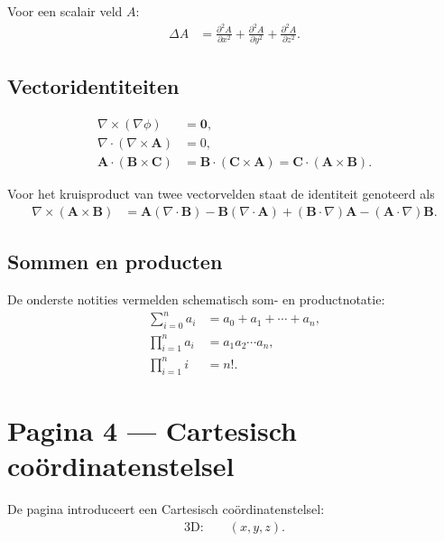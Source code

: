 \documentclass[11pt]{article}
\newcommand{\vect}[1]{\mathbf{#1}}
\begin{document}
Voor een scalair veld $A$:
\begin{align*}
\Delta A
  &=
  \frac{\partial^2 A}{\partial x^2}
  +\frac{\partial^2 A}{\partial y^2}
  +\frac{\partial^2 A}{\partial z^2}.
\end{align*}

\subsection*{Vectoridentiteiten}

\begin{align*}
\nabla\times\left(\nabla \phi\right) &= \vect{0},\\
\nabla\cdot\left(\nabla\times\vect{A}\right) &= 0,\\
\vect{A}\cdot\left(\vect{B}\times\vect{C}\right)
  &=
  \vect{B}\cdot\left(\vect{C}\times\vect{A}\right)
   =
  \vect{C}\cdot\left(\vect{A}\times\vect{B}\right).
\end{align*}

Voor het kruisproduct van twee vectorvelden staat de identiteit genoteerd als
\begin{align*}
\nabla\times\left(\vect{A}\times\vect{B}\right)
  &=
  \vect{A}\left(\nabla\cdot\vect{B}\right)
  -\vect{B}\left(\nabla\cdot\vect{A}\right)
  +\left(\vect{B}\cdot\nabla\right)\vect{A}
  -\left(\vect{A}\cdot\nabla\right)\vect{B}.
\end{align*}

\subsection*{Sommen en producten}

De onderste notities vermelden schematisch som- en productnotatie:
\begin{align*}
\sum_{i=0}^{n} a_i
  &= a_0+a_1+\cdots+a_n,\\
\prod_{i=1}^{n} a_i
  &= a_1a_2\cdots a_n,\\
\prod_{i=1}^{n} i
  &= n!.
\end{align*}

\section*{Pagina 4 --- Cartesisch coördinatenstelsel}

De pagina introduceert een Cartesisch coördinatenstelsel:
\begin{align*}
\text{3D:}\qquad
\left(x,y,z\right).
\end{align*}
\end{document}
